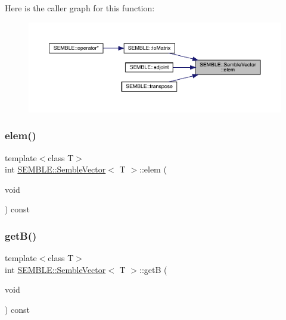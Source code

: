 Here is the caller graph for this function\+:
\nopagebreak
\begin{figure}[H]
\begin{center}
\leavevmode
\includegraphics[width=350pt]{d9/d94/structSEMBLE_1_1SembleVector_a4054d66d607dbedd52f2d11cd9d1086c_icgraph}
\end{center}
\end{figure}
\mbox{\label{structSEMBLE_1_1SembleVector_a4054d66d607dbedd52f2d11cd9d1086c}} 
\subsubsection{\texorpdfstring{elem()}{elem()}\hspace{0.1cm}{\footnotesize\ttfamily [2/2]}}
{\footnotesize\ttfamily template$<$class T$>$ \\
int \mbox{\hyperlink{structSEMBLE_1_1SembleVector}{S\+E\+M\+B\+L\+E\+::\+Semble\+Vector}}$<$ T $>$\+::elem (\begin{DoxyParamCaption}\item[{void}]{ }\end{DoxyParamCaption}) const\hspace{0.3cm}{\ttfamily [inline]}}

\mbox{\label{structSEMBLE_1_1SembleVector_a30ac55c6514b63443ad073ccc4913051}} 
\subsubsection{\texorpdfstring{getB()}{getB()}\hspace{0.1cm}{\footnotesize\ttfamily [1/2]}}
{\footnotesize\ttfamily template$<$class T$>$ \\
int \mbox{\hyperlink{structSEMBLE_1_1SembleVector}{S\+E\+M\+B\+L\+E\+::\+Semble\+Vector}}$<$ T $>$\+::getB (\begin{DoxyParamCaption}\item[{void}]{ }\end{DoxyParamCaption}) const\hspace{0.3cm}{\ttfamily [inline]}}

